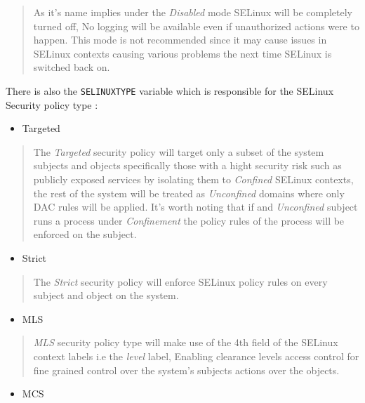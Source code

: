 \documentclass[
  14pt,
  english,
  a4paper,
]{scrreprt}
\providecommand{\tightlist}{%
  \setlength{\itemsep}{0pt}\setlength{\parskip}{0pt}}
\begin{document}
\begin{quote}
As it's name implies under the \emph{Disabled} mode SELinux will be
completely turned off, No logging will be available even if unauthorized
actions were to happen. This mode is not recommended since it may cause
issues in SELinux contexts causing various problems the next time
SELinux is switched back on.
\end{quote}

There is also the \texttt{SELINUXTYPE} variable which is responsible for
the SELinux Security policy type :

\begin{itemize}
\tightlist
\item
  Targeted
\end{itemize}

\begin{quote}
The \emph{Targeted} security policy will target only a subset of the
system subjects and objects specifically those with a hight security
risk such as publicly exposed services by isolating them to
\emph{Confined} SELinux contexts, the rest of the system will be treated
as \emph{Unconfined} domains where only DAC rules will be applied. It's
worth noting that if and \emph{Unconfined} subject runs a process under
\emph{Confinement} the policy rules of the process will be enforced on
the subject.
\end{quote}

\begin{itemize}
\tightlist
\item
  Strict
\end{itemize}

\begin{quote}
The \emph{Strict} security policy will enforce SELinux policy rules on
every subject and object on the system.
\end{quote}

\begin{itemize}
\tightlist
\item
  MLS
\end{itemize}

\begin{quote}
\emph{MLS} security policy type will make use of the 4th field of the
SELinux context labels i.e the \emph{level} label, Enabling clearance
levels access control for fine grained control over the system's
subjects actions over the objects.
\end{quote}

\begin{itemize}
\tightlist
\item
  MCS
\end{itemize}
\end{document}
